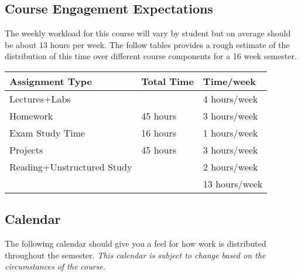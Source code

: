 \documentclass[10pt]{article}
\begin{document}
\subsection{Course Engagement Expectations}

The weekly workload for this course will vary by student but on average should be about 13 hours per week.  The follow tables provides a rough estimate of the distribution of this time over different course components for a 16 week semester.
\begin{center}
\begin{tabular}{lll}
Assignment Type & Total Time & Time/week \\ \toprule
Lectures+Labs &      & 4 hours/week \\
Homework & 45 hours        & 3 hours/week \\
Exam Study Time & 16 hours  & 1 hours/week \\
Projects & 45 hours        & 3 hours/week \\
Reading+Unstructured Study & & 2 hours/week \\
\bottomrule
& & 13 hours/week
\end{tabular}
\end{center}

\subsection{Calendar}

The following calendar should give you a feel for how work is distributed throughout the semester.  \textit{This calendar is subject to change based on the circumstances of the course.}
\end{document}
